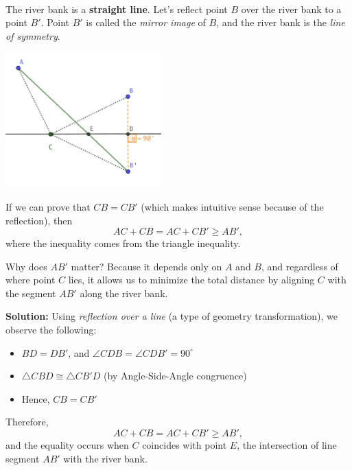 \documentclass{article}
\begin{document}
\begin{soln}\ \\\indent
    The river bank is a \textbf{straight line}. Let's reflect point \( B \) over the river bank to a point \( B' \). Point \( B' \) is called the \emph{mirror image} of \( B \), and the river bank is the \emph{line of symmetry}.

    \begin{center}
        \includegraphics[width=6cm]{./png/elizabeth.png}
    \end{center}

    If we can prove that \( CB = CB' \) (which makes intuitive sense because of the reflection), then
    \[
        AC + CB = AC + CB' \ge AB',
    \]
    where the inequality comes from the triangle inequality.

    Why does \( AB' \) matter? Because it depends only on \( A \) and \( B \), and regardless of where point \( C \) lies, it allows us to minimize the total distance by aligning \( C \) with the segment \( AB' \) along the river bank.

    \textbf{Solution:} Using \textit{reflection over a line} (a type of geometry transformation), we observe the following:

    \begin{itemize}[topsep=0pt, itemsep=2pt]
        \item \( BD = DB' \), and \( \angle CDB = \angle CDB' = 90^\circ \)
        \item \( \triangle CBD \cong \triangle CB'D \) (by Angle-Side-Angle congruence)
        \item Hence, \( CB = CB' \)
    \end{itemize}

    Therefore,
    \[
        AC + CB = AC + CB' \ge AB',
    \]
    and the equality occurs when \( C \) coincides with point \( E \), the intersection of line segment \( AB' \) with the river bank.

\end{soln}
\end{document}
